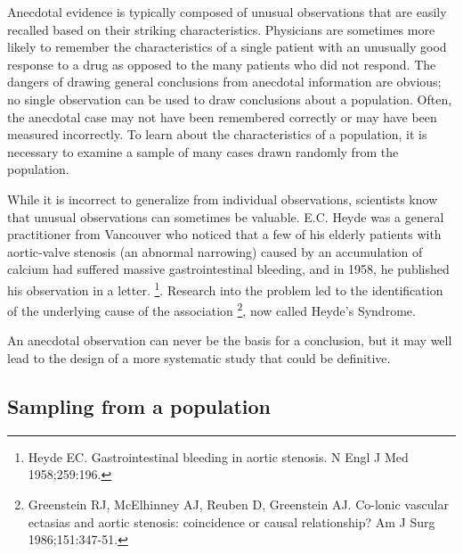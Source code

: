 \begin{doublespace}
Anecdotal evidence is typically composed of unusual observations that are easily recalled based on their striking characteristics. Physicians are sometimes more likely to remember the characteristics of a single patient with an unusually good response to a drug as opposed to the many patients who did not respond.  The dangers of drawing general conclusions from anecdotal information are obvious; no single observation can be used to draw conclusions about a population. Often, the anecdotal case may not have been remembered correctly or may have been measured incorrectly. To learn about the characteristics of a population, it is necessary to examine a sample of many cases drawn randomly from the population.

While it is incorrect to generalize from individual observations, scientists know that unusual observations can sometimes be valuable.  E.C. Heyde was a general practitioner from Vancouver who noticed that a few of his elderly patients with aortic-valve stenosis (an abnormal narrowing) caused by an accumulation of calcium had suffered massive gastrointestinal bleeding, and in 1958, he published his observation in a letter. \footnote{Heyde EC. Gastrointestinal bleeding in aortic stenosis. N Engl J Med 1958;259:196.}.  Research into the problem led to the identification of the underlying cause of the association \footnote{Greenstein RJ, McElhinney AJ, Reuben D, Greenstein AJ. Co-lonic vascular ectasias and aortic stenosis: coincidence or causal relationship? Am J Surg 1986;151:347-51.}, now called Heyde's Syndrome.

An anecdotal observation can never be the basis for a conclusion, but it may well lead to the design of a more systematic study that could be definitive.  


\subsection{Sampling from a population}


\end{doublespace}
